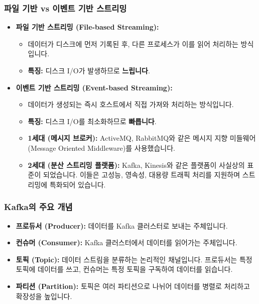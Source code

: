 \documentclass[11pt,a4paper]{article}
\begin{document}
\subsubsection{파일 기반 vs 이벤트 기반 스트리밍}
\begin{itemize}
    \item \textbf{파일 기반 스트리밍 (File-based Streaming):}
    \begin{itemize}
        \item 데이터가 디스크에 먼저 기록된 후, 다른 프로세스가 이를 읽어 처리하는 방식입니다.
        \item \textbf{특징:} 디스크 I/O가 발생하므로 \textbf{느립니다}.
    \end{itemize}
    \item \textbf{이벤트 기반 스트리밍 (Event-based Streaming):}
    \begin{itemize}
        \item 데이터가 생성되는 즉시 호스트에서 직접 가져와 처리하는 방식입니다.
        \item \textbf{특징:} 디스크 I/O를 최소화하므로 \textbf{빠릅니다}.
        \item \textbf{1세대 (메시지 브로커):} ActiveMQ, RabbitMQ와 같은 메시지 지향 미들웨어(Message Oriented Middleware)를 사용했습니다.
        \item \textbf{2세대 (분산 스트리밍 플랫폼):} Kafka, Kinesis와 같은 플랫폼이 사실상의 표준이 되었습니다. 이들은 고성능, 영속성, 대용량 트래픽 처리를 지원하며 스트리밍에 특화되어 있습니다.
    \end{itemize}
\end{itemize}

\subsubsection{Kafka의 주요 개념}
\begin{itemize}
    \item \textbf{프로듀서 (Producer):} 데이터를 Kafka 클러스터로 보내는 주체입니다.
    \item \textbf{컨슈머 (Consumer):} Kafka 클러스터에서 데이터를 읽어가는 주체입니다.
    \item \textbf{토픽 (Topic):} 데이터 스트림을 분류하는 논리적인 채널입니다. 프로듀서는 특정 토픽에 데이터를 쓰고, 컨슈머는 특정 토픽을 구독하여 데이터를 읽습니다.
    \item \textbf{파티션 (Partition):} 토픽은 여러 파티션으로 나뉘어 데이터를 병렬로 처리하고 확장성을 높입니다.
\end{itemize}
\end{document}
